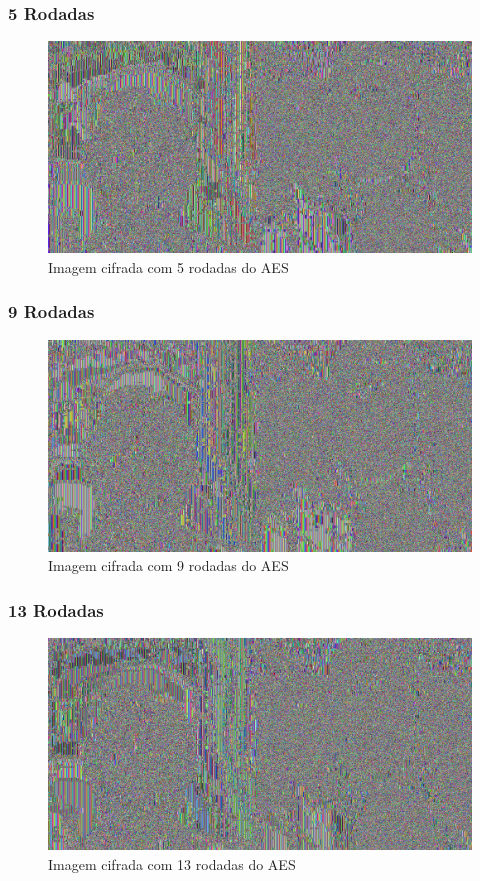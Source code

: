 \documentclass[12pt]{article}
\begin{document}
\subsubsection{5 Rodadas}

\begin{figure}[H]
	\centering
    \includegraphics[width=.5\textwidth]{img/ecb5.jpg}
    \caption{Imagem cifrada com 5 rodadas do AES}
\end{figure}

\subsubsection{9 Rodadas}

\begin{figure}[H]
	\centering
    \includegraphics[width=.5\textwidth]{img/ecb9.jpg}
    \caption{Imagem cifrada com 9 rodadas do AES}
\end{figure}

\subsubsection{13 Rodadas}

\begin{figure}[H]
	\centering
    \includegraphics[width=.5\textwidth]{img/ecb13.jpg}
    \caption{Imagem cifrada com 13 rodadas do AES}
\end{figure}

\end{document}
